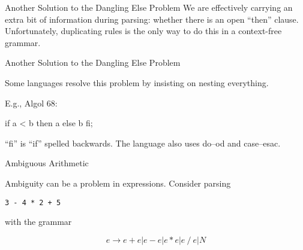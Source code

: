 \documentclass{plt}
\def\plus#1#2{node {\texttt{+}} child {#1} child {#2}}
\def\minus#1#2{node {\texttt{-}} child {#1} child {#2}}
\def\mult#1#2{node {\texttt{*}} child {#1} child {#2}}
\def\lit#1{node {#1}}
\begin{document}
\begin{frame}[fragile]{Another Solution to the Dangling Else Problem}
We are effectively carrying an extra bit of information during
parsing: whether there is an open ``then'' clause.  Unfortunately,
duplicating rules is the only way to do this in a context-free grammar.

\end{frame}


\begin{frame}[fragile]{Another Solution  to the Dangling Else Problem}

Some languages resolve this problem by insisting on nesting
everything.

E.g., Algol 68:

\begin{center}
\begin{algol}
if a < b then a else b fi;
\end{algol}
\end{center}

``fi'' is ``if'' spelled backwards.  The language also uses do--od and
case--esac.
\end{frame}

\begin{frame}{Ambiguous Arithmetic}

Ambiguity can be a problem in expressions.  Consider parsing

\begin{center}
\texttt{3 - 4 * 2 + 5}
\end{center}

with the grammar

\[e \rightarrow  e + e | e - e | e * e | e \mathop{/} e | N\]

\ttfamily

\hfil
{}
\hfil
{}
\hfil
{}


\end{frame}
\end{document}
